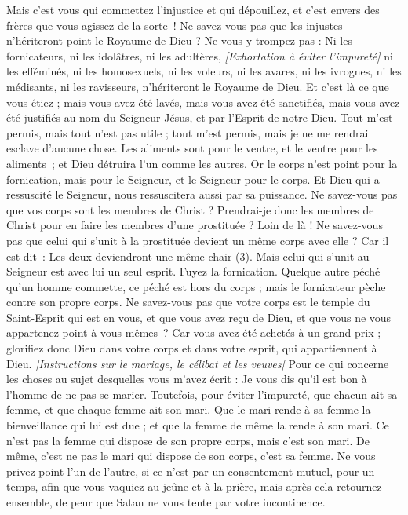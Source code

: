 \begin{multicols}{2}
Mais c’est vous qui commettez l’injustice et qui dépouillez, et c’est envers des frères que vous agissez de la sorte !
Ne savez-vous pas que les injustes n'hériteront point le Royaume de Dieu ? Ne vous y trompez pas : Ni les fornicateurs, ni les idolâtres, ni les adultères,
\textit{[Exhortation à éviter l'impureté]}
ni les efféminés, ni les homosexuels, ni les voleurs, ni les avares, ni les ivrognes, ni les médisants, ni les ravisseurs, n'hériteront le Royaume de Dieu.
Et c’est là ce que vous étiez ; mais vous avez été lavés, mais vous avez été sanctifiés, mais vous avez été justifiés au nom du Seigneur Jésus, et par l'Esprit de notre Dieu.
Tout m’est permis, mais tout n’est pas utile ; tout m’est permis, mais je ne me rendrai esclave d’aucune chose.
Les aliments sont pour le ventre, et le ventre pour les aliments ; et Dieu détruira l'un comme les autres. Or le corps n'est point pour la fornication, mais pour le Seigneur, et le Seigneur pour le corps.
Et Dieu qui a ressuscité le Seigneur, nous ressuscitera aussi par sa puissance.
Ne savez-vous pas que vos corps sont les membres de Christ ? Prendrai-je donc les membres de Christ pour en faire les membres d'une prostituée ? Loin de là !
Ne savez-vous pas que celui qui s'unit à la prostituée devient un même corps avec elle ? Car il est dit : Les deux deviendront une même chair (3).
Mais celui qui s’unit au Seigneur est avec lui un seul esprit.
Fuyez la fornication. Quelque autre péché qu’un homme commette, ce péché est hors du corps ; mais le fornicateur pèche contre son propre corps.
Ne savez-vous pas que votre corps est le temple du Saint-Esprit qui est en vous, et que vous avez reçu de Dieu, et que vous ne vous appartenez point à vous-mêmes ?
Car vous avez été achetés à un grand prix ; glorifiez donc Dieu dans votre corps et dans votre esprit, qui appartiennent à Dieu.
\textit{[Instructions sur le mariage, le célibat et les veuves]}
\VerseOne{}Pour ce qui concerne les choses au sujet desquelles vous m'avez écrit : Je vous dis qu'il est bon à l'homme de ne pas se marier.
Toutefois, pour éviter l'impureté, que chacun ait sa femme, et que chaque femme ait son mari.
Que le mari rende à sa femme la bienveillance qui lui est due ; et que la femme de même la rende à son mari.
Ce n’est pas la femme qui dispose de son propre corps, mais c’est son mari. De même, c’est ne pas le mari qui dispose de son corps, c’est sa femme.
Ne vous privez point l'un de l'autre, si ce n'est par un consentement mutuel, pour un temps, afin que vous vaquiez au jeûne et à la prière, mais après cela retournez ensemble, de peur que Satan ne vous tente par votre incontinence.

\end{multicols}
